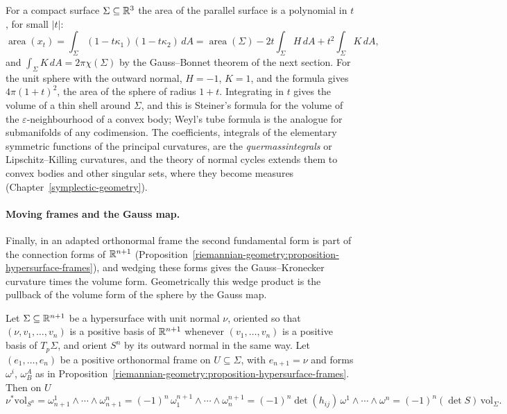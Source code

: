 \begin{remark}\label{riemannian-geometry:remark-steiner}
For a compact surface $\Sigma \subseteq \mathbb{R}^3$ the area of the parallel surface is a polynomial in $t$, for small $|t|$:
\[
\operatorname{area}(x_t) = \int_\Sigma(1 - t\kappa_1)(1 - t\kappa_2)\,dA = \operatorname{area}(\Sigma) - 2t\int_\Sigma H\,dA + t^2\int_\Sigma K\,dA,
\]
and $\int_\Sigma K\,dA = 2\pi\chi(\Sigma)$ by the Gauss--Bonnet theorem of the next section. For the unit sphere with the outward normal, $H = -1$, $K = 1$, and the formula gives $4\pi(1 + t)^2$, the area of
the sphere of radius $1 + t$. Integrating in $t$ gives the volume of a thin shell around $\Sigma$, and this is Steiner's formula for the volume of the $\varepsilon$-neighbourhood of a convex body; Weyl's tube formula
is the analogue for submanifolds of any codimension. The coefficients, integrals of the elementary symmetric functions of the principal curvatures, are the \emph{quermassintegrals} or Lipschitz--Killing curvatures,
and the theory of normal cycles extends them to convex bodies and other singular sets, where they become measures (Chapter~\ref{symplectic-geometry}).
\end{remark}

\paragraph{Moving frames and the Gauss map.} Finally, in an adapted orthonormal frame the second fundamental form is part of the connection forms of $\mathbb{R}^{n+1}$
(Proposition~\ref{riemannian-geometry:proposition-hypersurface-frames}), and wedging these forms gives the Gauss--Kronecker curvature times the volume form. Geometrically this wedge product is the pullback of the volume
form of the sphere by the Gauss map.

\begin{proposition}\label{riemannian-geometry:proposition-gauss-map-volume}
Let $\Sigma \subseteq \mathbb{R}^{n+1}$ be a hypersurface with unit normal $\nu$, oriented so that $(\nu, v_1, \ldots, v_n)$ is a positive basis of $\mathbb{R}^{n+1}$ whenever $(v_1, \ldots, v_n)$ is a positive basis of $T_p\Sigma$, and orient
$S^n$ by its outward normal in the same way. Let $(e_1, \ldots, e_n)$ be a positive orthonormal frame on $U \subseteq \Sigma$, with $e_{n+1} = \nu$ and forms $\omega^i$, $\omega^A_B$ as in
Proposition~\ref{riemannian-geometry:proposition-hypersurface-frames}. Then on $U$
\[
\nu^*\mathrm{vol}_{S^n} = \omega^1_{n+1} \wedge \cdots \wedge \omega^n_{n+1} = (-1)^n\,\omega^{n+1}_1 \wedge \cdots \wedge \omega^{n+1}_n = (-1)^n\det(h_{ij})\,\omega^1 \wedge \cdots \wedge \omega^n = (-1)^n(\det S)\,\mathrm{vol}_\Sigma .
\]
\end{proposition}

